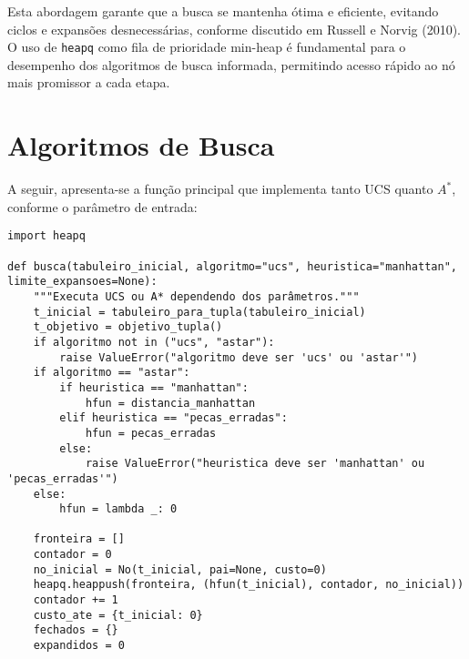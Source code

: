Esta abordagem garante que a busca se mantenha ótima e eficiente, evitando ciclos e expansões desnecessárias, conforme discutido em Russell e Norvig (2010). O uso de \texttt{heapq} como fila de prioridade min-heap é fundamental para o desempenho dos algoritmos de busca informada, permitindo acesso rápido ao nó mais promissor a cada etapa.  

\section{Algoritmos de Busca}  
A seguir, apresenta-se a função principal que implementa tanto UCS quanto $A^*$, conforme o parâmetro de entrada:  

\begin{verbatim}  
import heapq  

def busca(tabuleiro_inicial, algoritmo="ucs", heuristica="manhattan", limite_expansoes=None):  
    """Executa UCS ou A* dependendo dos parâmetros."""  
    t_inicial = tabuleiro_para_tupla(tabuleiro_inicial)  
    t_objetivo = objetivo_tupla()  
    if algoritmo not in ("ucs", "astar"):  
        raise ValueError("algoritmo deve ser 'ucs' ou 'astar'")  
    if algoritmo == "astar":  
        if heuristica == "manhattan":  
            hfun = distancia_manhattan  
        elif heuristica == "pecas_erradas":  
            hfun = pecas_erradas  
        else:  
            raise ValueError("heuristica deve ser 'manhattan' ou 'pecas_erradas'")  
    else:  
        hfun = lambda _: 0  

    fronteira = []  
    contador = 0  
    no_inicial = No(t_inicial, pai=None, custo=0)  
    heapq.heappush(fronteira, (hfun(t_inicial), contador, no_inicial))  
    contador += 1  
    custo_ate = {t_inicial: 0}  
    fechados = {}  
    expandidos = 0  


\end{verbatim}

